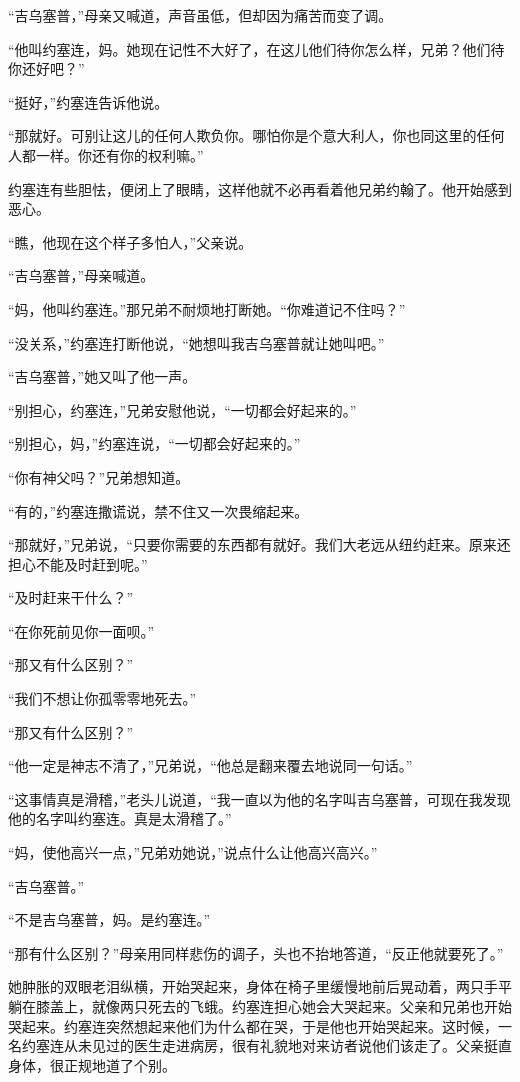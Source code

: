    “吉乌塞普，”母亲又喊道，声音虽低，但却因为痛苦而变了调。

    “他叫约塞连，妈。她现在记性不大好了，在这儿他们待你怎么样，兄弟？他们待你还好吧？”

    “挺好，”约塞连告诉他说。

    “那就好。可别让这儿的任何人欺负你。哪怕你是个意大利人，你也同这里的任何人都一样。你还有你的权利嘛。”

    约塞连有些胆怯，便闭上了眼睛，这样他就不必再看着他兄弟约翰了。他开始感到恶心。

    “瞧，他现在这个样子多怕人，”父亲说。

    “吉乌塞普，”母亲喊道。

    “妈，他叫约塞连。”那兄弟不耐烦地打断她。“你难道记不住吗？”

    “没关系，”约塞连打断他说，“她想叫我吉乌塞普就让她叫吧。”

    “吉乌塞普，”她又叫了他一声。

    “别担心，约塞连，”兄弟安慰他说，“一切都会好起来的。”

    “别担心，妈，”约塞连说，“一切都会好起来的。”

    “你有神父吗？”兄弟想知道。

    “有的，”约塞连撒谎说，禁不住又一次畏缩起来。

    “那就好，”兄弟说，“只要你需要的东西都有就好。我们大老远从纽约赶来。原来还担心不能及时赶到呢。”

    “及时赶来干什么？”

    “在你死前见你一面呗。”

    “那又有什么区别？”

    “我们不想让你孤零零地死去。”

    “那又有什么区别？”

    “他一定是神志不清了，”兄弟说，“他总是翻来覆去地说同一句话。”

    “这事情真是滑稽，”老头儿说道，“我一直以为他的名字叫吉乌塞普，可现在我发现他的名字叫约塞连。真是太滑稽了。”

    “妈，使他高兴一点，”兄弟劝她说，”说点什么让他高兴高兴。”

    “吉乌塞普。”

    “不是吉乌塞普，妈。是约塞连。”

    “那有什么区别？”母亲用同样悲伤的调子，头也不抬地答道，“反正他就要死了。”

    她肿胀的双眼老泪纵横，开始哭起来，身体在椅子里缓慢地前后晃动着，两只手平躺在膝盖上，就像两只死去的飞蛾。约塞连担心她会大哭起来。父亲和兄弟也开始哭起来。约塞连突然想起来他们为什么都在哭，于是他也开始哭起来。这时候，一名约塞连从未见过的医生走进病房，很有礼貌地对来访者说他们该走了。父亲挺直身体，很正规地道了个别。

